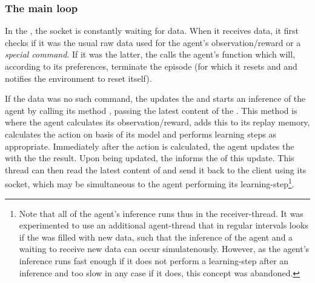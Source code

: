 \subsubsection{The main loop}

In the , the socket is constantly waiting for data. When it receives data, it first checks if it was the usual raw data used for the agent's observation/reward or a \textit{special command}. If it was the latter, the  calls the agent's function  which will, according to its preferences, terminate the episode (for which it resets  and  and notifies the environment to reset itself). 

If the data was no such command, the  updates the  and starts an inference of the agent by calling its method , passing the latest content of the . This method is where the agent calculates its observation/reward, adds this to its replay memory, calculates the action on basis of its model and performs learning steps as appropriate. Immediately after the action is calculated, the agent updates the  with the the result. Upon being updated, the  informs the  of this update. This thread can then read the latest content of  and send it back to the client using its socket, which may be simultaneous to the agent performing its learning-step\footnote{Note that all of the agent's inference runs thus in the receiver-thread. It was experimented to use an additional agent-thread that in regular intervals looks if the  was filled with new data, such that the inference of the agent and a waiting to receive new data can occur simulatenously. However, as the agent's inference runs fast enough if it does not perform a learning-step after an inference and too slow in any case if it does, this concept was abandoned.}. 

